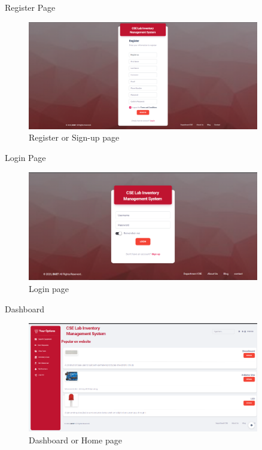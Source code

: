 \documentclass[20pt]{beamer}
\numberwithin{figure}{section}
\begin{document}
\begin{frame}{Register Page}

     \begin{figure}
        \centering
        \includegraphics[width= 0.9\textwidth , height= 0.3\paperheight]{Register.png}
        \caption{Register or Sign-up page}
        \label{fig:43}
    \end{figure}

\end{frame}

\begin{frame}{Login Page}

     \begin{figure}
        \centering
        \includegraphics[width= 0.9\textwidth , height= 0.3\paperheight]{Login.png}
        \caption{Login page}
        \label{fig:44}
    \end{figure}

\end{frame}

\begin{frame}{Dashboard}

     \begin{figure}
        \centering
        \includegraphics[width= 0.9\textwidth , height= 0.3\paperheight]{Dashboard.png}
        \caption{Dashboard or Home page}
        \label{fig:45}
    \end{figure}

\end{frame}
\end{document}
